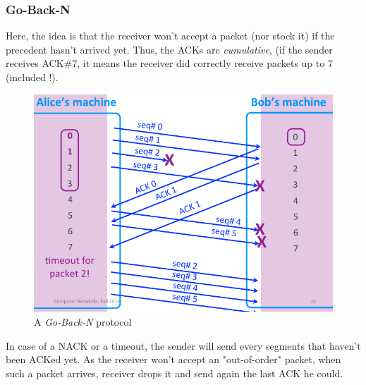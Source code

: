 \documentclass[12pt,a4paper]{article}
\begin{document}
\subsubsection{Go-Back-N}
Here, the idea is that the receiver won't accept a packet (nor stock it) if the precedent hasn't arrived yet. Thus, the ACKs are \textit{cumulative}, (if the sender receives ACK\#7, it means the receiver did correctly receive packets up to 7 (included !).
\begin{figure}[!h]
	\centering
	\includegraphics[scale=0.4]{images/goBackN}
	\caption{A \textit{Go-Back-N} protocol}
	\label{fig: Go-Back-N}
\end{figure}
In case of a NACK or a timeout, the sender will send every segments that haven't been ACKed yet.
As the receiver won't accept an "out-of-order" packet, when such a packet arrives, receiver drops it and send again the last ACK  he could.
\end{document}
